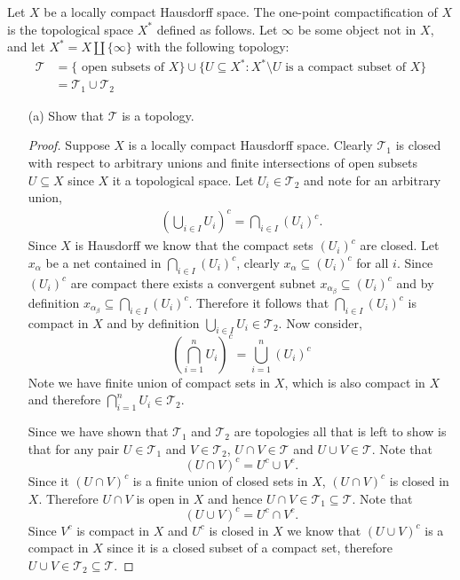 \documentclass{homework651}
\begin{document}
\begin{problems}
\problem Let $X$ be a locally compact Hausdorff space. The one-point compactification of $X$
is the topological space $X^*$ defined as follows. Let $\infty$ be some object not in $X$, and 
let $X^* = X \coprod \{\infty\}$ with the following topology:
\begin{align*}
    \mathcal{T} &= \{\text{ open subsets of $X$}\} \cup \{U \subseteq X^*: X^* \setminus U \text{ is a compact subset of } X\}\\
    &= \mathcal{T}_1 \cup \mathcal{T}_2 
\end{align*}
\begin{enumerate}
    \item[(a)] Show that $\mathcal{T}$ is a topology.
    \begin{proof} Suppose $X$ is a locally compact Hausdorff space. Clearly $\mathcal{T}_1$ is 
        closed with respect to arbitrary unions and finite intersections of open subsets $U \subseteq X$ since $X$ it a topological space. Let $U_i \in \mathcal{T}_2$ and note for an arbitrary union, 
        \begin{align*}
            \left(\bigcup_{i \in I}U_i\right)^c = \bigcap_{i \in I}(U_i)^c.
        \end{align*}
        Since $X$ is Hausdorff we know that the compact sets $(U_i)^c$ are closed. Let 
        $x_\alpha$ be a net contained in $\bigcap_{i \in I}(U_i)^c$, clearly $x_\alpha \subseteq (U_i)^c$ for all $i$. Since $(U_i)^c$ are compact there exists a convergent subnet $x_{\alpha_\beta} \subseteq (U_i)^c$ and by definition $x_{\alpha_\beta} \subseteq \bigcap_{i \in I}(U_i)^c$. Therefore it follows that $\bigcap_{i \in I}(U_i)^c$ is compact in $X$ and
        by definition $\bigcup_{i \in I}U_i \in \mathcal{T}_2$. 
        Now consider, 
        \begin{equation*}
            \left(\bigcap_{i = 1}^n U_i\right)^c = \bigcup_{i = 1}^n (U_i)^c
        \end{equation*}
        Note we have finite union of compact sets in $X$, which is also compact in $X$
        and therefore $\bigcap_{i = 1}^n U_i \in \mathcal{T}_2$.

        Since we have shown that $\mathcal{T}_1$ and $\mathcal{T}_2$ are topologies all that is left to show is that for any pair $U \in \mathcal{T}_1$ and $V \in \mathcal{T}_2$, $U \cap V \in \mathcal{T}$ and $U\cup V \in \mathcal{T}$. Note that 
        \begin{equation*}
            (U\cap V)^c = U^c \cup V^c.
        \end{equation*}
        Since it $(U\cap V)^c$ is a finite union of closed sets in $X$, $(U\cap V)^c$ is closed in $X$. Therefore $U \cap V$ is open in $X$ and hence $U \cap V \in \mathcal{T}_1 \subseteq \mathcal{T}$.
        Note that 
        \begin{equation*}
            (U\cup V)^c = U^c \cap V^c.
        \end{equation*}
        Since $V^c$ is compact in $X$ and $U^c$ is closed in $X$ we know that $(U\cup V)^c$ is a compact in $X$ since it is a closed subset of a compact set, therefore  
        $U \cup V  \in \mathcal{T}_2 \subseteq \mathcal{T}$.


\end{proof}
\end{enumerate}
\end{problems}
\end{document}

